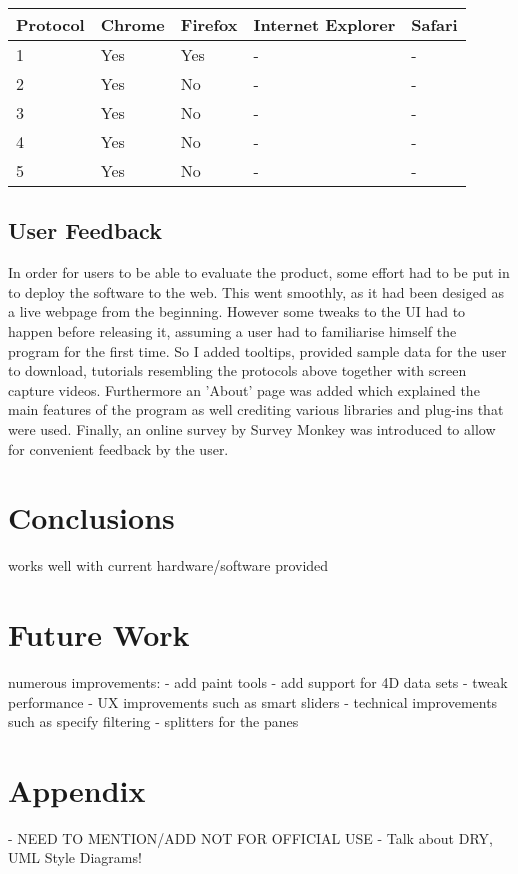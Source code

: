 \documentclass[a4paper,11pt,titlepage]{article}
\begin{document}
\begin{center}

  \begin{tabular}{ | l || l | l | l | l |}
    \hline
    Protocol & Chrome & Firefox & Internet Explorer & Safari \\ \hline \hline
    1 & Yes & Yes  & -  & - \\ \hline
    2 & Yes & No & - & - \\ \hline
   3 & Yes & No & - & - \\ \hline
   4 & Yes & No & - & - \\ \hline
   5 & Yes & No & - & - \\
    \hline
  \end{tabular}

\end{center}


\subsection{User Feedback}

In order for users to be able to evaluate the product, some effort had to be put in to deploy the software to the web. This went smoothly, as it had been desiged as a live webpage from the beginning. However some tweaks to the UI had to happen before releasing it, assuming a user had to familiarise himself the program for the first time. So I added tooltips, provided sample data for the user to download, tutorials resembling the protocols above together with screen capture videos. Furthermore an 'About' page was added which explained the main features of the program as well crediting various libraries and plug-ins that were used. Finally, an online survey by Survey Monkey was introduced to allow for convenient feedback by the user.


\section{Conclusions}

works well with current hardware/software provided


\section{Future Work}

numerous improvements:
- add paint tools
- add support for 4D data sets
- tweak performance
- UX improvements such as smart sliders
- technical improvements such as specify filtering
- splitters for the panes











\newpage

  \begin{thebibliography}{1}

  \end{thebibliography}

\newpage

\section{Appendix}


- NEED TO MENTION/ADD NOT FOR OFFICIAL USE
- Talk about DRY, UML Style Diagrams!
\end{document}
